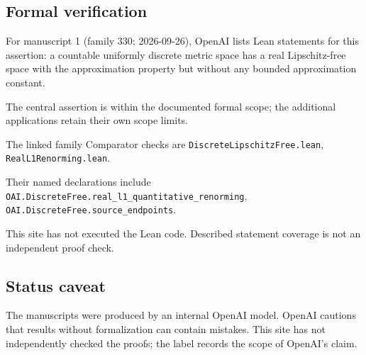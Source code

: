 \documentclass[11pt]{article}
\begin{document}
\subsection{Formal verification}
For manuscript 1 (family 330; 2026-09-26), OpenAI lists Lean statements for this assertion: a countable uniformly discrete metric space has a real Lipschitz-free space with the approximation property but without any bounded approximation constant.

The central assertion is within the documented formal scope; the additional applications retain their own scope limits.

The linked family Comparator checks are \texttt{DiscreteLipschitzFree.lean}, \texttt{RealL1Renorming.lean}.

Their named declarations include \texttt{OAI.DiscreteFree.real\_l1\_quantitative\_renorming}, \texttt{OAI.DiscreteFree.source\_endpoints}.

This site has not executed the Lean code. Described statement coverage is not an independent proof check.

\subsection{Status caveat}
The manuscripts were produced by an internal OpenAI model. OpenAI cautions that results without formalization can contain mistakes. This site has not independently checked the proofs; the label records the scope of OpenAI's claim.
\end{document}

